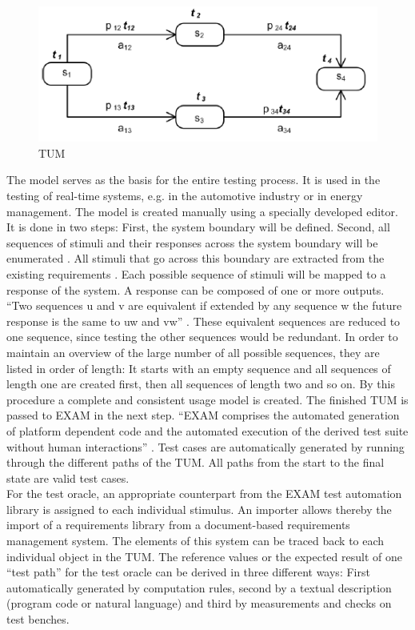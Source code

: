 \begin{figure}[H]
	\centering
	\includegraphics{../images/TUM}
	\caption{TUM \cite{Siegl2010}}
\end{figure}
The model serves as the basis for the entire testing process. It is
used in the testing of real-time systems, e.g. in the automotive industry
or in energy management. The model is created manually using a specially
developed editor. \\
It is done in two steps: First, the system boundary will be defined.
Second, all sequences of stimuli and their responses across the system
boundary will be enumerated \cite{Siegl2010}. All stimuli that go
across this boundary are extracted from the existing requirements
\cite{Siegl2010}. Each possible sequence of stimuli will be mapped
to a response of the system. A response can be composed of one or
more outputs. \enquote{Two sequences u and v are equivalent if
extended by any sequence w the future response is the same to uw and
vw} \cite{Siegl2010}. These equivalent sequences are
reduced to one sequence, since testing the other sequences would be
redundant. In order to maintain an overview of the large number of
all possible sequences, they are listed in order of length: It starts
with an empty sequence \textlambda
and all sequences of length one
are created first, then all sequences of length two and so on. By
this procedure a complete and consistent usage model is created. The
finished TUM is passed to EXAM in the next step. \enquote{EXAM
comprises the automated generation of platform dependent code and
the automated execution of the derived test suite without human interactions}
\cite{Siegl2010}. Test cases are automatically generated by running
through the different paths of the TUM. All paths from the start to
the final state are valid test cases.\\
For the test oracle, an appropriate counterpart from the EXAM test
automation library is assigned to each individual stimulus. An importer
allows thereby the import of a requirements library from a document-based
requirements management system. The elements of this system can be
traced back to each individual object in the TUM. The reference values
or the expected result of one \enquote{test path}
for the test oracle can be derived in three different ways: First
automatically generated by computation rules, second by a textual
description (program code or natural language) and third by measurements
and checks on test benches.

